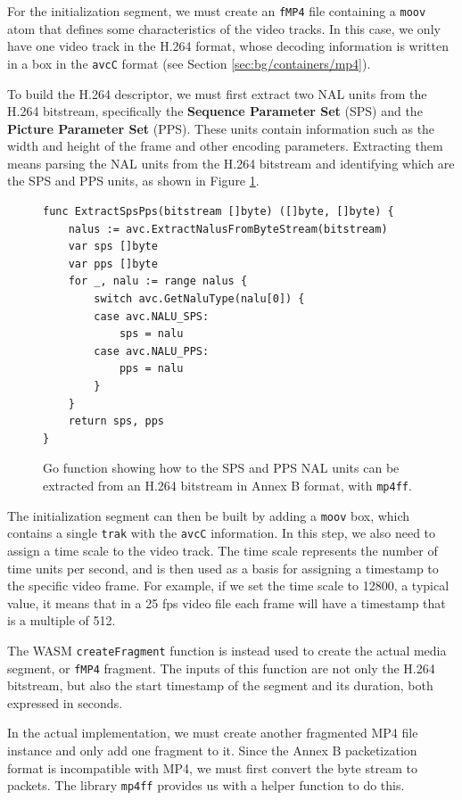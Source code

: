 For the initialization segment, we must create an \texttt{fMP4} file containing a \texttt{moov} atom that defines some characteristics of the video tracks. In this case, we only have one video track in the H.264 format, whose decoding information is written in a box in the \texttt{avcC} format (see Section \ref{sec:bg/containers/mp4}).

To build the H.264 descriptor, we must first extract two NAL units from the H.264 bitstream, specifically the \textbf{Sequence Parameter Set} (SPS) and the \textbf{Picture Parameter Set} (PPS). These units contain information such as the width and height of the frame and other encoding parameters. Extracting them means parsing the NAL units from the H.264 bitstream and identifying which are the SPS and PPS units, as shown in Figure \ref{fig:wasm_go_sps}.

\begin{figure}[h]
    \centering
    \begin{verbatim}
func ExtractSpsPps(bitstream []byte) ([]byte, []byte) {
	nalus := avc.ExtractNalusFromByteStream(bitstream)
	var sps []byte
	var pps []byte
	for _, nalu := range nalus {
		switch avc.GetNaluType(nalu[0]) {
		case avc.NALU_SPS:
			sps = nalu
		case avc.NALU_PPS:
			pps = nalu
		}
	}
	return sps, pps
}
    \end{verbatim}
    \caption{Go function showing how to the SPS and PPS NAL units can be extracted from an H.264 bitstream in Annex B format, with \texttt{mp4ff}.}
    \label{fig:wasm_go_sps}
\end{figure}

The initialization segment can then be built by adding a \texttt{moov} box, which contains a single \texttt{trak} with the \texttt{avcC} information. In this step, we also need to assign a time scale to the video track. The time scale represents the number of time units per second, and is then used as a basis for assigning a timestamp to the specific video frame. For example, if we set the time scale to 12800, a typical value, it means that in a 25 fps video file each frame will have a timestamp that is a multiple of 512.

The WASM \texttt{createFragment} function is instead used to create the actual media segment, or \texttt{fMP4} fragment. The inputs of this function are not only the H.264 bitstream, but also the start timestamp of the segment and its duration, both expressed in seconds.

In the actual implementation, we must create another fragmented MP4 file instance and only add one fragment to it. Since the Annex B packetization format is incompatible with MP4, we must first convert the byte stream to packets. The library \texttt{mp4ff} provides us with a helper function to do this.


